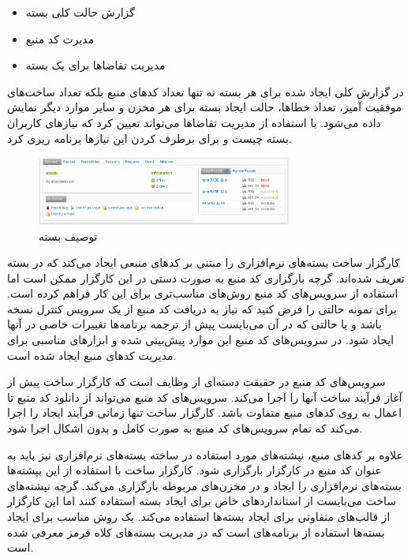 \begin{itemize}
  \item گزارش حالت کلی بسته
  \item مدیرت کد منبع
  \item مدیریت تقاضا‌ها برای یک بسته
\end{itemize}

در گزارش کلی ایجاد شده برای هر بسته نه تنها تعداد کدهای منبع بلکه تعداد ساخت‌های
موفقیت آمیز، تعداد خطاها، حالت ایجاد بسته برای هر مخزن و سایر موارد دیگر نمایش
داده می‌شود. با استفاده از مدیریت تقاضاها می‌تواند تعیین کرد که نیازهای کاربران
بسته چیست و برای برطرف کردن این نیازها برنامه ریزی کرد.

\begin{figure}
\centering
\includegraphics[width=0.75\textwidth]{image/standard/build/opensuse-project-package.png}
\caption[برگه مدیریت پرونده‌ها در کارگزار ساخت ]{
	توصیف بسته
}
\label{image/standard/build/opensuse-project-package}
\end{figure}

کارگزار ساخت بسته‌های نرم‌افزاری را مبتنی بر کدهای منبعی ایجاد می‌کند که در بسته
تعریف شده‌اند. گرچه بارگزاری کد منبع به صورت دستی در این کارگزار ممکن است اما
استفاده از سرویس‌های کد منبع روش‌های مناسب‌تری برای این کار فراهم کرده است. برای
نمونه حالتی را فرض کنید که نیاز به دریافت کد منبع از یک سرویس کنترل نسخه باشد و
یا حالتی که در آن می‌بایست پیش از ترجمه برنامه‌ها تغییرات خاصی در آنها ایجاد
شود. در سرویس‌های کد منبع این موارد پیش‌بینی شده و ابزارهای مناسبی برای مدیریت
کدهای منبع ایجاد شده است.

سرویس‌های کد منبع در حقیقت دسته‌ای از وظایف است که کارگزار ساخت پیش از آغاز
فرآیند ساخت آنها را اجرا می‌کند. سرویس‌های کد منبع می‌تواند از دانلود کد منبع تا
اعمال  به روی کدهای منبع متفاوت باشد. کارگزار ساخت تنها زمانی فرآيند
ایجاد را اجرا می‌کند که تمام سرویس‌های کد منبع به صورت کامل و بدون اشکال اجرا
شود.

علاوه بر کدهای منبع، نپشته‌های مورد استفاده در ساخته بسته‌های نرم‌افزاری نیز
باید به عنوان کد منبع در کارگزار بارگزاری شود. کارگزار ساخت با استفاده از این
بپشته‌ها بسته‌های نرم‌افزاری را ایجاد و در مخزن‌های مربوطه بارگزاری می‌کند.
گرچه نپشته‌های ساخت می‌بایست از استانداردهای خاص برای ایجاد بسته استفاده کنند
اما این کارگزار از قالب‌های متفاوتی برای ایجاد بسته‌ها استفاده می‌کند. یک روش
مناسب برای ایجاد بسته‌ها استفاده از برنامه‌های  است که در مدیریت
بسته‌های کلاه قرمز معرفی شده است. 

